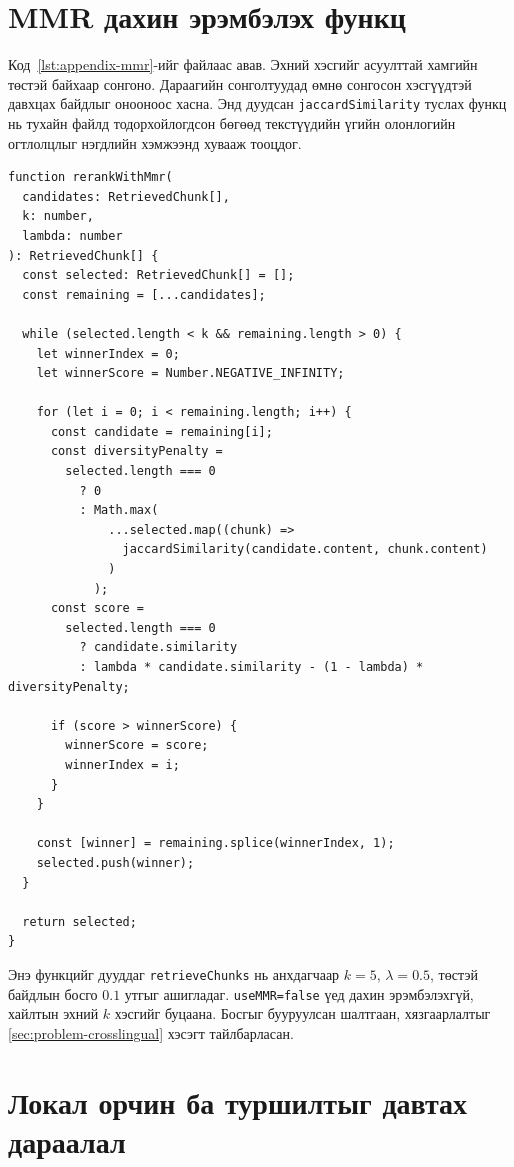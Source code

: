 \documentclass[../main.tex]{subfiles}
\begin{document}
\section{MMR дахин эрэмбэлэх функц}
\label{sec:appendix-mmr}

Код~\ref{lst:appendix-mmr}-ийг
 файлаас авав.
Эхний хэсгийг асуулттай хамгийн төстэй байхаар сонгоно. Дараагийн
сонголтуудад өмнө сонгосон хэсгүүдтэй давхцах байдлыг онооноос хасна.
Энд дуудсан \texttt{jaccardSimilarity} туслах функц нь тухайн файлд
тодорхойлогдсон бөгөөд текстүүдийн үгийн олонлогийн огтлолцлыг нэгдлийн
хэмжээнд хувааж тооцдог.

\begin{lstlisting}[caption={Хамаарал ба давхардлыг харгалзан хэсэг сонгох нь}, label={lst:appendix-mmr}]
function rerankWithMmr(
  candidates: RetrievedChunk[],
  k: number,
  lambda: number
): RetrievedChunk[] {
  const selected: RetrievedChunk[] = [];
  const remaining = [...candidates];

  while (selected.length < k && remaining.length > 0) {
    let winnerIndex = 0;
    let winnerScore = Number.NEGATIVE_INFINITY;

    for (let i = 0; i < remaining.length; i++) {
      const candidate = remaining[i];
      const diversityPenalty =
        selected.length === 0
          ? 0
          : Math.max(
              ...selected.map((chunk) =>
                jaccardSimilarity(candidate.content, chunk.content)
              )
            );
      const score =
        selected.length === 0
          ? candidate.similarity
          : lambda * candidate.similarity - (1 - lambda) * diversityPenalty;

      if (score > winnerScore) {
        winnerScore = score;
        winnerIndex = i;
      }
    }

    const [winner] = remaining.splice(winnerIndex, 1);
    selected.push(winner);
  }

  return selected;
}
\end{lstlisting}

Энэ функцийг дууддаг \texttt{retrieveChunks} нь анхдагчаар $k=5$,
$\lambda=0.5$, төстэй байдлын босго $0.1$ утгыг ашигладаг.
\texttt{useMMR=false} үед дахин эрэмбэлэхгүй, хайлтын эхний $k$ хэсгийг
буцаана. Босгыг бууруулсан шалтгаан, хязгаарлалтыг
\ref{sec:problem-crosslingual} хэсэгт тайлбарласан.

\section{Локал орчин ба туршилтыг давтах дараалал}
\label{sec:appendix-verification}
\end{document}
